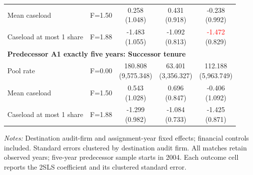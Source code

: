 \begin{table}[htbp]
\begin{threeparttable}
\begin{tabular}{p{}cccc}
Mean caseload & F=1.50 & \shortstack{0.258\\(1.048)} & \shortstack{0.431\\(0.918)} & \shortstack{-0.238\\(0.992)} \\
Caseload at most 1 share & F=1.88 & \shortstack{-1.483\\(1.055)} & \shortstack{-1.092\\(0.813)} & \shortstack{\textcolor{red}{-1.472\sym{*}}\\(0.829)} \\
\multicolumn{5}{l}{\textbf{Predecessor A1 exactly five years: Successor tenure}} \\
Pool rate & F=0.00 & \shortstack{180.808\\(9,575.348)} & \shortstack{63.401\\(3,356.327)} & \shortstack{112.188\\(5,963.749)} \\
Mean caseload & F=1.50 & \shortstack{0.543\\(1.028)} & \shortstack{0.696\\(0.847)} & \shortstack{-0.406\\(1.092)} \\
Caseload at most 1 share & F=1.88 & \shortstack{-1.299\\(0.982)} & \shortstack{-1.084\\(0.733)} & \shortstack{-1.425\\(0.871)} \\
\bottomrule
\end{tabular}
\begin{tablenotes}\footnotesize
\item \raggedright \textit{Notes:} Destination audit-firm and assignment-year fixed effects; financial controls included. Standard errors clustered by destination audit firm. All matches retain observed years; five-year predecessor sample starts in 2004. Each outcome cell reports the 2SLS coefficient and its clustered standard error.
\end{tablenotes}
\end{threeparttable}
\end{table}
